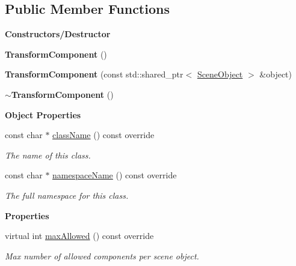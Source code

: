 \subsection*{Public Member Functions}
\begin{Indent}\textbf{ Constructors/\+Destructor}\par
\begin{DoxyCompactItemize}
\item 
\mbox{\label{classrev_1_1_transform_component_af63e8a246b8ad649019747af9f16ab9b}} 
{\bfseries Transform\+Component} ()
\item 
\mbox{\label{classrev_1_1_transform_component_a7d0c316548c679262de60a770466d6d4}} 
{\bfseries Transform\+Component} (const std\+::shared\+\_\+ptr$<$ \mbox{\hyperlink{classrev_1_1_scene_object}{Scene\+Object}} $>$ \&object)
\item 
\mbox{\label{classrev_1_1_transform_component_ad0045f03ad42194b4e9d4828ab25f70d}} 
{\bfseries $\sim$\+Transform\+Component} ()
\end{DoxyCompactItemize}
\end{Indent}
\begin{Indent}\textbf{ Object Properties}\par
\begin{DoxyCompactItemize}
\item 
const char $\ast$ \mbox{\hyperlink{classrev_1_1_transform_component_a04a11c6b0b9f124c53a84226a488a1e9}{class\+Name}} () const override
\begin{DoxyCompactList}\small\item\em The name of this class. \end{DoxyCompactList}\item 
const char $\ast$ \mbox{\hyperlink{classrev_1_1_transform_component_a7dc2abcb1d759a29c28fc8ceb632a31d}{namespace\+Name}} () const override
\begin{DoxyCompactList}\small\item\em The full namespace for this class. \end{DoxyCompactList}\end{DoxyCompactItemize}
\end{Indent}
\begin{Indent}\textbf{ Properties}\par
\begin{DoxyCompactItemize}
\item 
\mbox{\label{classrev_1_1_transform_component_aed45da6b047fa6615c1064ac8f23c8fb}} 
virtual int \mbox{\hyperlink{classrev_1_1_transform_component_aed45da6b047fa6615c1064ac8f23c8fb}{max\+Allowed}} () const override
\begin{DoxyCompactList}\small\item\em Max number of allowed components per scene object. \end{DoxyCompactList}\end{DoxyCompactItemize}
\end{Indent}
